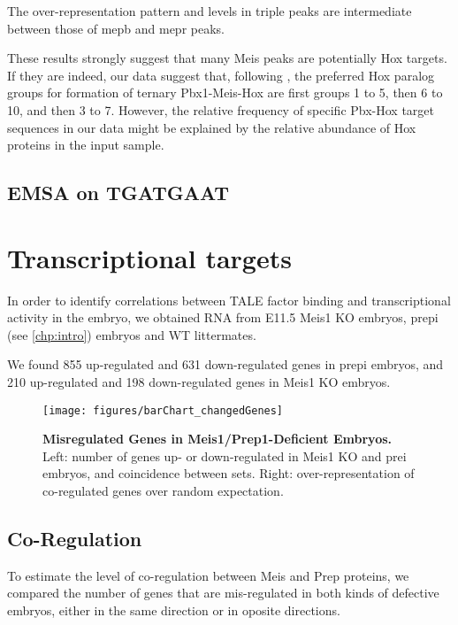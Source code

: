 The over-representation pattern and levels in triple peaks are intermediate between those of \ac{mepb} and \ac{mepr} peaks. 

These results strongly suggest that many Meis peaks are potentially Hox targets. If they are indeed, our data suggest that, following \cite{Shen1997}, the preferred Hox paralog groups for formation of ternary Pbx1-Meis-Hox are first groups 1 to 5, then 6 to 10, and then 3 to 7. However, the relative frequency of specific Pbx-Hox target sequences in our data might be explained by the relative abundance of Hox proteins in the input sample.

\subsection{EMSA on TGATGAAT}



\section{Transcriptional targets}

In order to identify correlations between \ac{TALE} factor binding and transcriptional activity in the embryo, we obtained RNA from E11.5 Meis1 \ac{KO} embryos, \ac{prepi} (see \ref{chp:intro}) embryos and \ac{WT} littermates. 

We found 855 up-regulated and 631 down-regulated genes in \ac{prepi} embryos, and 210 up-regulated and 198 down-regulated genes in Meis1 \ac{KO} embryos. 

\begin{figure}[]
  \centering
  \texttt{[image: figures/barChart\_changedGenes]}
  \caption[Misregulated Genes in Meis1/Prep1-Deficient Embryos]{\textbf{Misregulated Genes in Meis1/Prep1-Deficient Embryos.} Left: number of genes up- or down-regulated in Meis1 \ac{KO} and \ac{prei} embryos, and coincidence between sets. Right: over-representation of co-regulated genes over random expectation.}
  \label{fig:changedGenes}
\end{figure}

\subsection{Co-Regulation}

To estimate the level of co-regulation between Meis and Prep proteins, we compared the number of genes that are mis-regulated in both kinds of defective embryos, either in the same direction or in oposite directions. 

